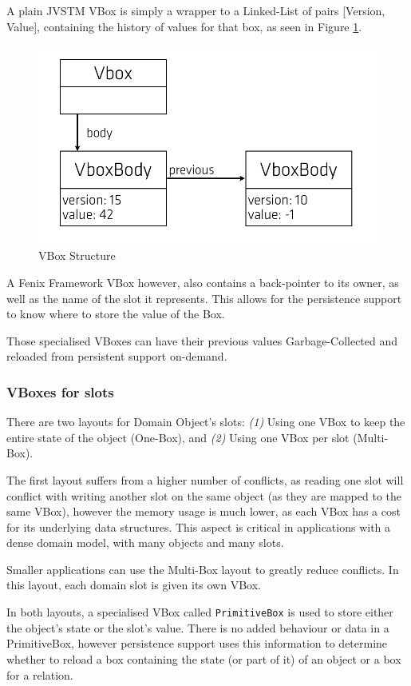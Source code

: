 \documentclass{llncs}
\begin{document}
A plain JVSTM VBox is simply a wrapper to a Linked-List of pairs
[Version, Value], containing the history of values for that
box, as seen in Figure \ref{fig:vbox}.

\begin{figure}
\centering
\includegraphics[width=0.5\linewidth]{vbox-list}
\caption{VBox Structure}
\label{fig:vbox}
\end{figure}

A Fenix Framework VBox however, also contains a back-pointer to its
owner, as well as the name of the slot it represents. This allows for
the persistence support to know where to store the value of the Box.

Those specialised VBoxes can have their previous values
Garbage-Collected and reloaded from persistent support on-demand.

\subsubsection{VBoxes for slots}

There are two layouts for Domain Object's slots: {\it (1)} Using one
VBox to keep the entire state of the object (One-Box), and {\it (2)}
Using one VBox per slot (Multi-Box).

The first layout suffers from a higher number of conflicts, as reading
one slot will conflict with writing another slot on the same object
(as they are mapped to the same VBox), however the memory usage is
much lower, as each VBox has a cost for its underlying data
structures. This aspect is critical in applications with a dense
domain model, with many objects and many slots.

Smaller applications can use the Multi-Box layout to greatly reduce
conflicts. In this layout, each domain slot is given its own VBox.

In both layouts, a specialised VBox called \texttt{PrimitiveBox} is
used to store either the object's state or the slot's value. There is
no added behaviour or data in a PrimitiveBox, however persistence
support uses this information to determine whether to reload a box
containing the state (or part of it) of an object or a box for a relation.
\end{document}

